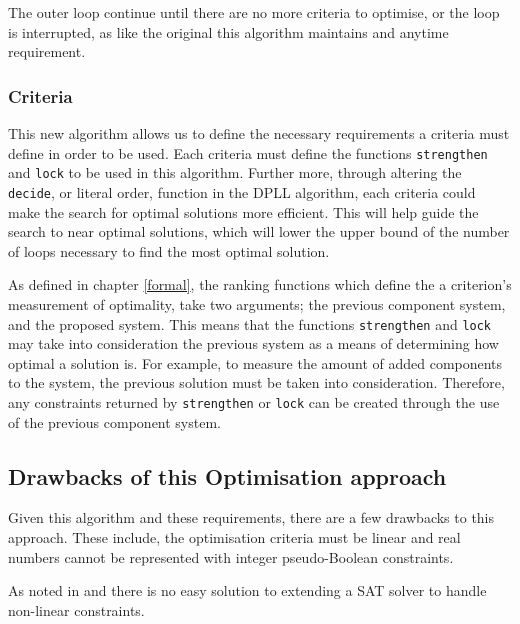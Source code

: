 The outer loop continue until there are no more criteria to optimise, or the loop is interrupted, as like the original this algorithm maintains and anytime requirement.

\subsubsection{Criteria}
This new algorithm allows us to define the necessary requirements a criteria must define in order to be used.
Each criteria must define the functions \verb+strengthen+ and \verb+lock+ to be used in this algorithm.
Further more, through altering the \verb+decide+, or literal order, function in the DPLL algorithm, each criteria could make the search for optimal solutions more efficient.
This will help guide the search to near optimal solutions, which will lower the upper bound of the number of loops necessary to find the most optimal solution.

As defined in chapter \ref{formal}, the ranking functions which define the a criterion's measurement of optimality, take two arguments;
the previous component system, and the proposed system.
This means that the functions \verb+strengthen+ and \verb+lock+ may take into consideration the previous system as a means of determining how optimal a solution is.
For example, to measure the amount of added components to the system, the previous solution must be taken into consideration.
Therefore, any constraints returned by \verb+strengthen+ or \verb+lock+ can be created through the use of the previous component system. 

\subsection{Drawbacks of this Optimisation approach}
Given this algorithm and these requirements, there are a few drawbacks to this approach.
These include, the optimisation criteria must be linear and real numbers cannot be represented with integer pseudo-Boolean constraints.

As noted in \cite{le_berre_dependency_2009} and \cite{leBerre2010} there is no easy solution to extending a SAT solver to handle non-linear constraints.



